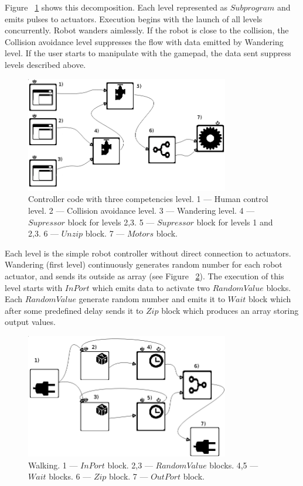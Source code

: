 \documentclass[conference,compsoc]{IEEEtran}
\begin{document}
Figure ~\ref{image:3layers} shows this decomposition. Each level represented as $Subprogram$ and emits pulses to actuators. Execution begins with the launch of all levels concurrently. Robot wanders aimlessly. If the robot is close to the collision, the Collision avoidance level suppresses the flow with data emitted by Wandering level. If the user starts to manipulate with the gamepad, the data sent suppress levels described above.

\begin{figure}[ht]
	\centering
	\includegraphics[width=3.5in]{3layers.png}
	\caption{Controller code with three competencies level. 1 --- Human control level. 2 --- Collision avoidance level. 3 --- Wandering level. 4 --- $Supressor$ block for levels 2,3. 5 --- $Supressor$ block for levels 1 and  2,3. 6 --- $Unzip$ block.  7 --- $Motors$ block.}
	\label{image:3layers}
\end{figure}

Each level is the simple robot controller without direct connection to actuators. Wandering (first level) continuously generates random number for each robot actuator, and sends its outside as array (see Figure ~\ref{image:1l}). The execution of this level starts with $InPort$ which emits data to activate two $RandomValue$ blocks. Each $RandomValue$ generate random number and emits it to $Wait$ block which after some predefined delay sends it to $Zip$ block which produces an array storing output values.

\begin{figure}[ht]
	\centering
	\includegraphics[width=3.5in]{1l.png}
	\caption{Walking. 1 --- $InPort$ block.  2,3 --- $RandomValue$ blocks. 4,5 --- $Wait$ blocks. 6 --- $Zip$ block. 7 --- $OutPort$ block.}
	\label{image:1l}
\end{figure}
\end{document}
